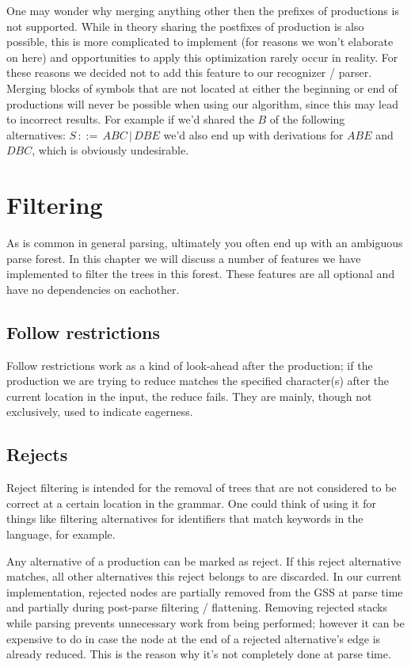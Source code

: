 \documentclass[a4paper,10pt]{article}
\begin{document}
One may wonder why merging anything other then the prefixes of productions is not supported. While in theory sharing the postfixes of production is also possible, this is more complicated to implement (for reasons we won't elaborate on here) and opportunities to apply this optimization rarely occur in reality. For these reasons we decided not to add this feature to our recognizer / parser. Merging blocks of symbols that are not located at either the beginning or end of productions will never be possible when using our algorithm, since this may lead to incorrect results. For example if we'd shared the $B$ of the following alternatives: $S\,::=\,ABC\,|\,DBE$ we'd also end up with derivations for $ABE$ and $DBC$, which is obviously undesirable.

\section{Filtering}

As is common in general parsing, ultimately you often end up with an ambiguous parse forest. In this chapter we will discuss a number of features we have implemented to filter the trees in this forest. These features are all optional and have no dependencies on eachother.

\subsection{Follow restrictions}

Follow restrictions work as a kind of look-ahead after the production; if the production we are trying to reduce matches the specified character(s) after the current location in the input, the reduce fails. They are mainly, though not exclusively, used to indicate eagerness.

\subsection{Rejects}

Reject filtering is intended for the removal of trees that are not considered to be correct at a certain location in the grammar. One could think of using it for things like filtering alternatives for identifiers that match keywords in the language, for example.

Any alternative of a production can be marked as reject. If this reject alternative matches, all other alternatives this reject belongs to are discarded. In our current implementation, rejected nodes are partially removed from the GSS at parse time and partially during post-parse filtering / flattening. Removing rejected stacks while parsing prevents unnecessary work from being performed; however it can be expensive to do in case the node at the end of a rejected alternative's edge is already reduced. This is the reason why it's not completely done at parse time.
\end{document}
